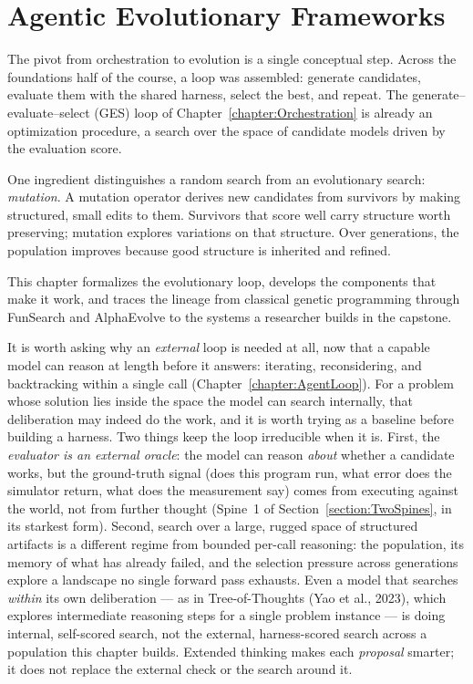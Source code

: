 \chapter{Agentic Evolutionary Frameworks}
\label{chapter:EvolutionaryFrameworks}

The pivot from orchestration to evolution is a single conceptual step.
Across the foundations half of the course, a loop was assembled: generate candidates, evaluate them with the shared harness, select the best, and repeat.
The generate–evaluate–select (GES) loop of Chapter~\ref{chapter:Orchestration} is already an optimization procedure, a search over the space of candidate models driven by the evaluation score.

One ingredient distinguishes a random search from an evolutionary search: \emph{mutation}.
A mutation operator derives new candidates from survivors by making structured, small edits to them.
Survivors that score well carry structure worth preserving; mutation explores variations on that structure.
Over generations, the population improves because good structure is inherited and refined.

This chapter formalizes the evolutionary loop, develops the components that make it work, and traces the lineage from classical genetic programming through FunSearch and AlphaEvolve to the systems a researcher builds in the capstone.

\begin{remark}
It is worth asking why an \emph{external} loop is needed at all, now that a capable model can reason at length before it answers: iterating, reconsidering, and backtracking within a single call (Chapter~\ref{chapter:AgentLoop}).
For a problem whose solution lies inside the space the model can search internally, that deliberation may indeed do the work, and it is worth trying as a baseline before building a harness.
Two things keep the loop irreducible when it is.
First, the \emph{evaluator is an external oracle}: the model can reason \emph{about} whether a candidate works, but the ground-truth signal (does this program run, what error does the simulator return, what does the measurement say) comes from executing against the world, not from further thought (Spine~1 of Section~\ref{section:TwoSpines}, in its starkest form).
Second, search over a large, rugged space of structured artifacts is a different regime from bounded per-call reasoning: the population, its memory of what has already failed, and the selection pressure across generations explore a landscape no single forward pass exhausts.
Even a model that searches \emph{within} its own deliberation --- as in Tree-of-Thoughts (Yao et al., 2023), which explores intermediate reasoning steps for a single problem instance --- is doing internal, self-scored search, not the external, harness-scored search across a population this chapter builds.
Extended thinking makes each \emph{proposal} smarter; it does not replace the external check or the search around it.
\end{remark}

